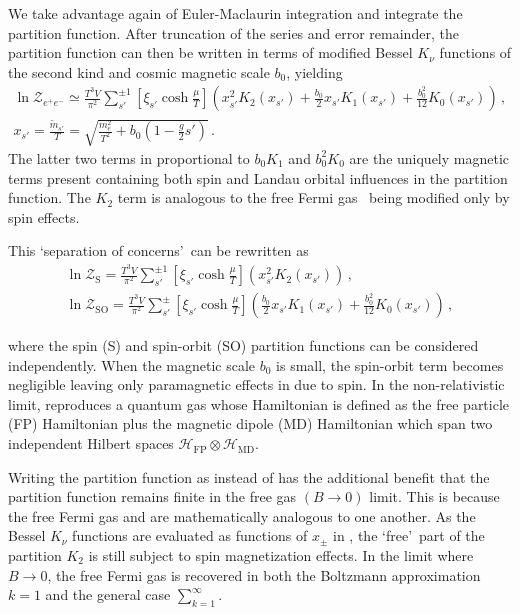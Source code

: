 We take advantage again of Euler-Maclaurin integration  and integrate the partition function. After truncation of the series and error remainder, the partition function  can then be written in terms of modified Bessel $K_{\nu}$ functions of the second kind and cosmic magnetic scale $b_{0}$, yielding
\begin{gather}
    \label{boltzmann}
    \boxed{\ln\mathcal{Z}_{e^{+}e^{-}}\simeq\frac{T^{3}V}{\pi^{2}}\sum_{s'}^{\pm1}\left[\xi_{s'}\cosh{\frac{\mu}{T}}\right]
    \left(x_{s'}^{2}K_{2}(x_{s'})+\frac{b_{0}}{2}x_{s'}K_{1}(x_{s'})+\frac{b_{0}^{2}}{12}K_{0}(x_{s'})\right)}\,,\\
    \label{xfunc}
    x_{s'}=\frac{{\tilde m}_{s'}}{T}=\sqrt{\frac{m_{e}^{2}}{T^{2}}+b_{0}\left(1-\frac{g}{2}s'\right)}\,.
\end{gather}
The latter two terms in  proportional to $b_{0}K_{1}$ and $b_{0}^{2}K_{0}$ are the uniquely magnetic terms present containing both spin and Landau orbital influences in the partition function. The $K_{2}$ term is analogous to the free Fermi gas~\citep{greiner2012thermodynamics} being modified only by spin effects.

This \lq separation of concerns\rq\ can be rewritten as
\begin{gather}
    \label{spin}
    \ln\mathcal{Z}_\mathrm{S}=\frac{T^{3}V}{\pi^{2}}\sum_{s'}^{\pm1}\left[\xi_{s'}\cosh{\frac{\mu}{T}}\right]\left(x_{s'}^{2}K_{2}(x_{s'})\right)\,,\\
    \label{spinorbit}
    \ln\mathcal{Z}_\mathrm{SO}=\frac{T^{3}V}{\pi^{2}}\sum_{s'}^{\pm}\left[\xi_{s'}\cosh{\frac{\mu}{T}}\right]
    \left(\frac{b_{0}}{2}x_{s'}K_{1}(x_{s'})+\frac{b_{0}^{2}}{12}K_{0}(x_{s'})\right)\,,        
\end{gather}

where the spin (S) and spin-orbit (SO) partition functions can be considered independently. When the magnetic scale $b_{0}$ is small, the spin-orbit term  becomes negligible leaving only paramagnetic effects in  due to spin. In the non-relativistic limit,  reproduces a quantum gas whose Hamiltonian is defined as the free particle (FP) Hamiltonian plus the magnetic dipole (MD) Hamiltonian which span two independent Hilbert spaces $\mathcal{H}_\mathrm{FP}\otimes\mathcal{H}_\mathrm{MD}$.

Writing the partition function as  instead of  has the additional benefit that the partition function remains finite in the free gas $({B}\rightarrow0)$ limit. This is because the free Fermi gas and  are mathematically analogous to one another. As the Bessel $K_{\nu}$ functions are evaluated as functions of $x_{\pm}$ in , the \lq free\rq\ part of the partition $K_{2}$ is still subject to spin magnetization effects. In the limit where ${B}\rightarrow0$, the free Fermi gas is recovered in both the Boltzmann approximation $k=1$ and the general case $\sum_{k=1}^{\infty}$.

